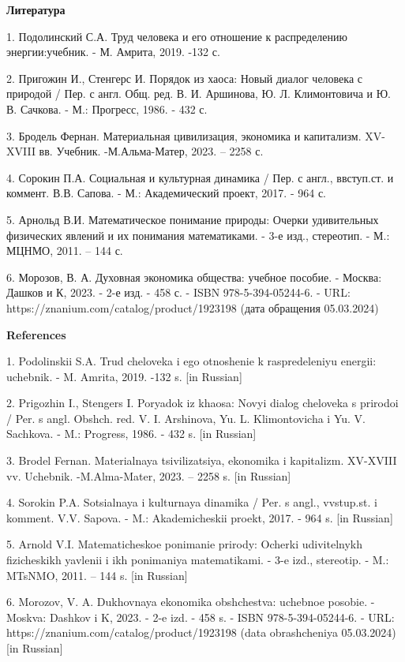{\bfseries Литература}

1. Подолинский С.А. Труд человека и его отношение к распределению
энергии:учебник. - М. Амрита, 2019. -132 с.

2. Пригожин И., Стенгерс И. Порядок из хаоса: Новый диалог человека с
природой / Пер. с англ. Общ. ред. В. И. Аршинова, Ю. Л. Климонтовича и
Ю. В. Сачкова. - М.: Прогресс, 1986. - 432 с.

3. Бродель Фернан. Материальная цивилизация, экономика и капитализм.
XV-XVIII вв. Учебник. -М.Альма-Матер, 2023. -- 2258 с.

4. Сорокин П.А. Социальная и культурная динамика / Пер. с англ.,
ввступ.ст. и коммент. В.В. Сапова. - М.: Академический проект, 2017. -
964 с.

5. Арнольд В.И. Математическое понимание природы: Очерки удивительных
физических явлений и их понимания математиками. - 3-е изд., стереотип. -
М.: МЦНМО, 2011. -- 144 с.

6. Морозов, В. А. Духовная экономика общества: учебное пособие. -
Москва: Дашков и К, 2023. - 2-е изд. - 458 с. - ISBN 978-5-394-05244-6.
- URL: https://znanium.com/catalog/product/1923198 (дата обращения
05.03.2024)

{\bfseries References}

1. Podolinskii S.A. Trud cheloveka i ego otnoshenie k raspredeleniyu
energii: uchebnik. - M. Amrita, 2019. -132 s. {[}in Russian{]}

2. Prigozhin I., Stengers I. Poryadok iz khaosa: Novyi dialog cheloveka
s prirodoi / Per. s angl. Obshch. red. V. I. Arshinova, Yu. L.
Klimontovicha i Yu. V. Sachkova. - M.: Progress, 1986. - 432 s. {[}in
Russian{]}

3. Brodel\textquotesingle{} Fernan. Material\textquotesingle naya
tsivilizatsiya, ekonomika i kapitalizm. XV-XVIII vv. Uchebnik.
-M.Al\textquotesingle ma-Mater, 2023. -- 2258 s. {[}in Russian{]}

4. Sorokin P.A. Sotsial\textquotesingle naya i
kul\textquotesingle turnaya dinamika / Per. s angl., vvstup.st. i
komment. V.V. Sapova. - M.: Akademicheskii proekt, 2017. - 964 s. {[}in
Russian{]}

5. Arnol\textquotesingle d V.I. Matematicheskoe ponimanie prirody:
Ocherki udivitel\textquotesingle nykh fizicheskikh yavlenii i ikh
ponimaniya matematikami. - 3-e izd., stereotip. - M.: MTsNMO, 2011. --
144 s. {[}in Russian{]}

6. Morozov, V. A. Dukhovnaya ekonomika obshchestva: uchebnoe posobie. -
Moskva: Dashkov i K, 2023. - 2-e izd. - 458 s. - ISBN 978-5-394-05244-6.
- URL: https://znanium.com/catalog/product/1923198 (data obrashcheniya
05.03.2024) {[}in Russian{]}

